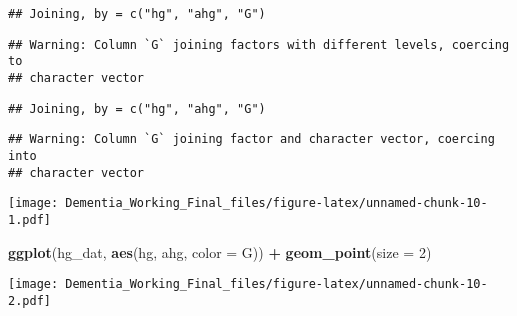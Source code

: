 \documentclass[]{article}
\newenvironment{Shaded}{\begin{snugshade}}{\end{snugshade}}
\newcommand{\DataTypeTok}[1]{\textcolor[rgb]{0.13,0.29,0.53}{#1}}
\newcommand{\DecValTok}[1]{\textcolor[rgb]{0.00,0.00,0.81}{#1}}
\newcommand{\KeywordTok}[1]{\textcolor[rgb]{0.13,0.29,0.53}{\textbf{#1}}}
\newcommand{\NormalTok}[1]{#1}
\newcommand{\OperatorTok}[1]{\textcolor[rgb]{0.81,0.36,0.00}{\textbf{#1}}}
\newcommand{\StringTok}[1]{\textcolor[rgb]{0.31,0.60,0.02}{#1}}
\begin{document}
\begin{verbatim}
## Joining, by = c("hg", "ahg", "G")
\end{verbatim}

\begin{verbatim}
## Warning: Column `G` joining factors with different levels, coercing to
## character vector
\end{verbatim}

\begin{verbatim}
## Joining, by = c("hg", "ahg", "G")
\end{verbatim}

\begin{verbatim}
## Warning: Column `G` joining factor and character vector, coercing into
## character vector
\end{verbatim}

\begin{Shaded}
\end{Shaded}

\texttt{[image: Dementia\_Working\_Final\_files/figure-latex/unnamed-chunk-10-1.pdf]}

\begin{Shaded}
\begin{Highlighting}[]
\KeywordTok{ggplot}\NormalTok{(hg_dat, }\KeywordTok{aes}\NormalTok{(hg, ahg, }\DataTypeTok{color =}\NormalTok{ G)) }\OperatorTok{+}\StringTok{ }\KeywordTok{geom_point}\NormalTok{(}\DataTypeTok{size =} \DecValTok{2}\NormalTok{)}
\end{Highlighting}
\end{Shaded}

\texttt{[image: Dementia\_Working\_Final\_files/figure-latex/unnamed-chunk-10-2.pdf]}

\begin{Shaded}
\end{Shaded}
\end{document}
